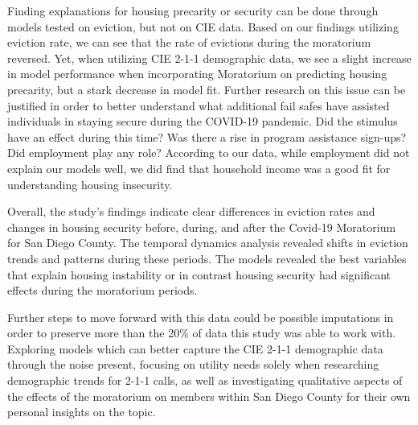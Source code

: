 \documentclass[man, 12pt, donotrepeattitle, floatsintext]{apa7} %
\begin{document}
Finding explanations for housing precarity or security can be done through models tested on eviction, but not on CIE data. Based on our findings utilizing eviction rate, we can see that the rate of evictions during the moratorium reversed. Yet, when utilizing CIE 2-1-1 demographic data, we see a slight increase in model performance when incorporating Moratorium on predicting housing precarity, but a stark decrease in model fit. Further research on this issue can be justified in order to better understand what additional fail safes have assisted individuals in staying secure during the COVID-19 pandemic. Did the stimulus have an effect during this time? Was there a rise in program assistance sign-ups? Did employment play any role? According to our data, while employment did not explain our models well, we did find that household income was a good fit for understanding housing insecurity.

Overall, the study's findings indicate clear differences in eviction rates and changes in housing security before, during, and after the Covid-19 Moratorium for San Diego County. The temporal dynamics analysis revealed shifts in eviction trends and patterns during these periods. The models revealed the best variables that explain housing instability or in contrast housing security had significant effects during the moratorium periods. 

Further steps to move forward with this data could be possible imputations in order to preserve more than the 20\% of data this study was able to work with. Exploring models which can better capture the CIE 2-1-1 demographic data through the noise present, focusing on utility needs solely when researching demographic trends for 2-1-1 calls, as well as investigating qualitative aspects of the effects of the moratorium on members within San Diego County for their own personal insights on the topic.

\printbibliography[]
\end{document}
